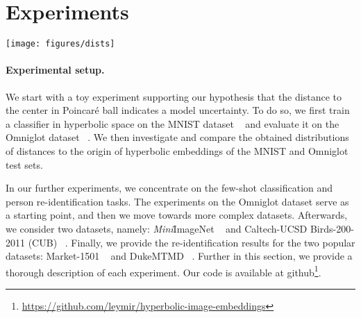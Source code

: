 \documentclass[10pt,twocolumn,letterpaper]{article}
\begin{document}
 \section{Experiments}\label{sec:experiments}

\begin{figure*}[htb!]
    \centering
    \texttt{[image: figures/dists]}
    \caption{Distributions of the hyperbolic distance to the origin of the MNIST (red) and Omniglot (blue) datasets embedded into the Poincar\'e ball; parameter  denotes embedding dimension of the model trained for MNIST classification. Most Omniglot instances can be easily identified as out-of-domain based on their distance to the origin.
}
     \label{fig:dists_omni}
     \vspace{-5mm}
\end{figure*}

\paragraph{Experimental setup.}
We start with a toy experiment supporting our hypothesis that the distance to the center in Poincar\'e ball indicates a model uncertainty. To do so, we first train a classifier in hyperbolic space on the MNIST dataset ~\cite{lecun1998gradient} and evaluate it on the Omniglot dataset ~\cite{lake2013one}. We then investigate and compare the obtained distributions of distances to the origin of hyperbolic embeddings of the MNIST and Omniglot test sets. 

In our further experiments, we concentrate on the few-shot classification and person re-identification tasks. The experiments on the Omniglot dataset serve as a starting point, and then we move towards more complex datasets. Afterwards, we consider two datasets, namely: \textit{Mini}ImageNet ~\cite{ravi2016optimization} and Caltech-UCSD Birds-200-2011 (CUB) ~\cite{wah2011caltech}.
Finally, we provide the re-identification results for the two popular datasets: Market-1501 ~\cite{zheng2015scalable} and DukeMTMD ~\cite{ristani2016MTMC,zheng2017unlabeled}.
Further in this section, we provide a thorough description of each experiment. Our code is available at github\footnote{\href{https://github.com/leymir/hyperbolic-image-embeddings}{https://github.com/leymir/hyperbolic-image-embeddings}}.
\end{document}
